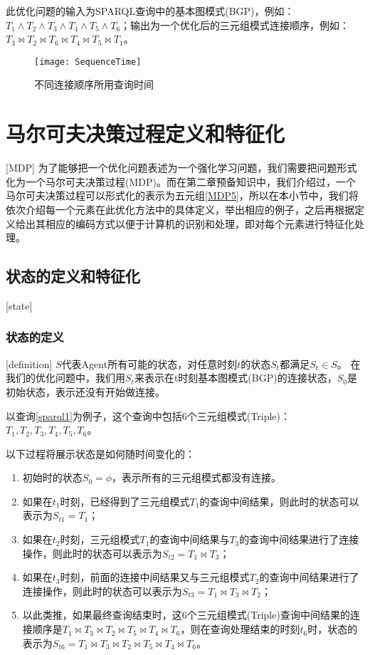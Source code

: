 此优化问题的输入为SPARQL查询中的基本图模式(BGP)，例如：$T_1\wedge T_2\wedge T_3\wedge T_4\wedge T_5\wedge T_6$；输出为一个优化后的三元组模式连接顺序，例如：$T_3 \Join T_2 \Join T_6 \Join T_4 \Join T_5 \Join T_1$。
\begin{figure}[h]
    \centering
    \texttt{[image: SequenceTime]}
    \caption{不同连接顺序所用查询时间}
    \label{SequenceTime}
\end{figure}

\section{马尔可夫决策过程定义和特征化}[MDP]
为了能够把一个优化问题表述为一个强化学习问题，我们需要把问题形式化为一个马尔可夫决策过程(MDP)。而在第二章预备知识中，我们介绍过，一个马尔可夫决策过程可以形式化的表示为五元组\ref{MDP5}，所以在本小节中，我们将依次介绍每一个元素在此优化方法中的具体定义，举出相应的例子，之后再根据定义给出其相应的编码方式以便于计算机的识别和处理，即对每个元素进行特征化处理。
\subsection{状态的定义和特征化}[state]
\subsubsection{状态的定义}[definition]
$S$代表Agent所有可能的状态，对任意时刻$t$的状态$S_t$都满足$S_t \in S$。
在我们的优化问题中，我们用$S_t$来表示在t时刻基本图模式(BGP)的连接状态，$S_0$是初始状态，表示还没有开始做连接。

以查询\ref{sparql1}为例子，这个查询中包括6个三元组模式(Triple)：$T_1, T_2, T_3, T_4, T_5, T_6$。

以下过程将展示状态是如何随时间变化的：
\begin{enumerate}
    \item 初始时的状态$S_0=\phi$，表示所有的三元组模式都没有连接。
    \item 如果在$t_1$时刻，已经得到了三元组模式$T_1$的查询中间结果，则此时的状态可以表示为$S_{t1} = T_1$； 
    \item 如果在$t_2$时刻，三元组模式$T_1$的查询中间结果与$T_3$的查询中间结果进行了连接操作，则此时的状态可以表示为$S_{t2} = T_1 \Join T_3$；
    \item 如果在$t_3$时刻，前面的连接中间结果又与三元组模式$T_2$的查询中间结果进行了连接操作，则此时的状态可以表示为$S_{t3} = T_1 \Join T_3 \Join T_2$；
    \item 以此类推，如果最终查询结束时，这6个三元组模式(Triple)查询中间结果的连接顺序是$T_1 \Join T_3 \Join T_2 \Join T_5 \Join T_4 \Join T_6$，则在查询处理结束的时刻$t_6$时，状态的表示为$S_{t6} = T_1 \Join T_3 \Join T_2 \Join T_5 \Join T_4 \Join T_6$。
\end{enumerate}


